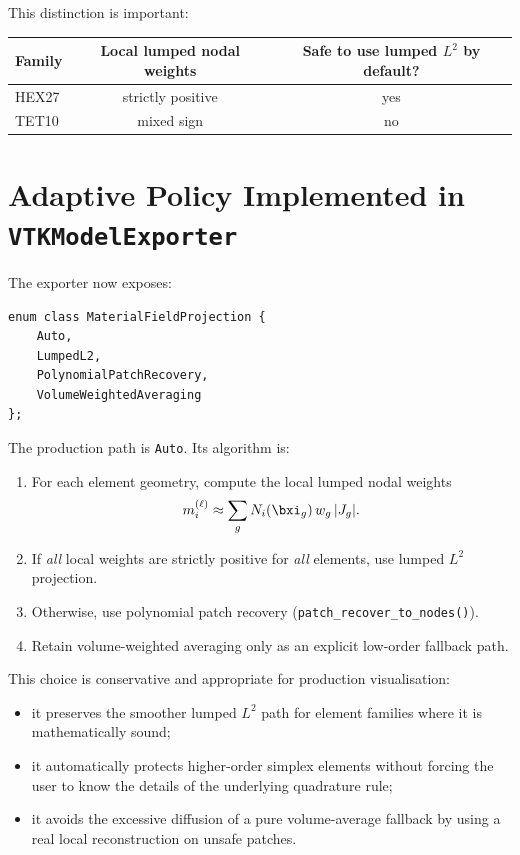 This distinction is important:
\begin{center}
\renewcommand{\arraystretch}{1.2}
\begin{tabular}{lcc}
  \toprule
  Family & Local lumped nodal weights & Safe to use lumped $L^2$ by default? \\
  \midrule
  HEX27 & strictly positive & yes \\
  TET10 & mixed sign        & no  \\
  \bottomrule
\end{tabular}
\end{center}


\section{Adaptive Policy Implemented in \texttt{VTKModelExporter}}
\label{sec:adaptive_policy}

The exporter now exposes:
\begin{lstlisting}
enum class MaterialFieldProjection {
    Auto,
    LumpedL2,
    PolynomialPatchRecovery,
    VolumeWeightedAveraging
};
\end{lstlisting}

The production path is \texttt{Auto}.  Its algorithm is:
\begin{enumerate}[nosep]
  \item For each element geometry, compute the local lumped nodal weights
        \[
          m_i^{(\ell)} \approx \sum_g N_i(\bxi_g)\, w_g\, |J_g|.
        \]
  \item If \emph{all} local weights are strictly positive for \emph{all}
        elements, use lumped $L^2$ projection.
  \item Otherwise, use polynomial patch recovery
        (\texttt{patch\_recover\_to\_nodes()}).
  \item Retain volume-weighted averaging only as an explicit low-order
        fallback path.
\end{enumerate}

This choice is conservative and appropriate for production visualisation:
\begin{itemize}[nosep]
  \item it preserves the smoother lumped $L^2$ path for element families where
        it is mathematically sound;
  \item it automatically protects higher-order simplex elements without forcing
        the user to know the details of the underlying quadrature rule;
  \item it avoids the excessive diffusion of a pure volume-average fallback by
        using a real local reconstruction on unsafe patches.
\end{itemize}

